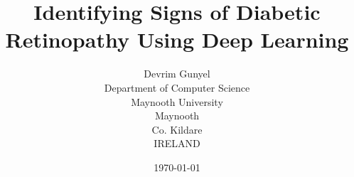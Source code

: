 \documentclass[a4paper,12pt]{report}
\begin{document}
\author{Devrim Gunyel\\
  Department of Computer Science\\
  Maynooth University\\
  Maynooth\\
  Co. Kildare\\
  IRELAND}
\date{\today}
\title{Identifying Signs of Diabetic Retinopathy Using Deep Learning}
\maketitle







\tableofcontents

\newpage








\cleardoublepage
\end{document}
